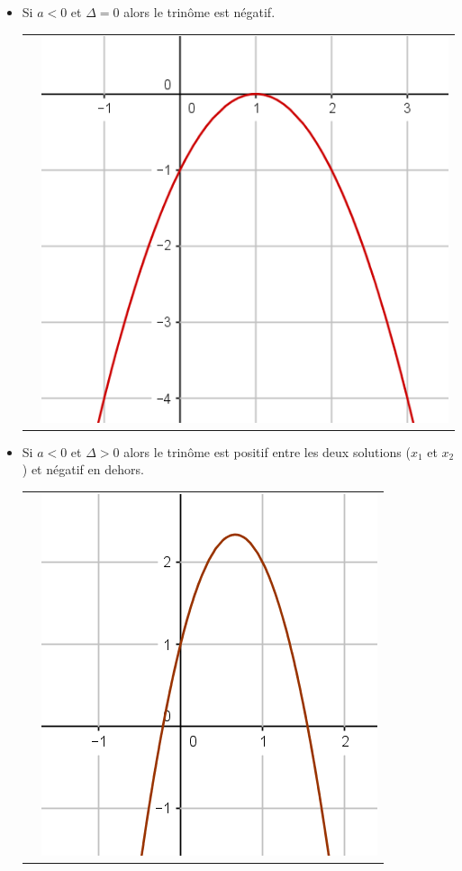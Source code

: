 \documentclass[12pt,a4paper]{article}
\begin{document}
\begin{itemize}
			
				
				\item 
				Si $a < 0$ et $\Delta = 0$ alors le trinôme est négatif.
				
				\begin{tabular}{ll }
					 &
					
					\includegraphics[scale=0.25]{./img/fig_2}\\
				\end{tabular}
				
				\item 
				Si $a < 0$ et $\Delta > 0$ alors le trinôme est positif entre les deux solutions ($x_1$ et $x_2$) et négatif en dehors.
				
				\begin{tabular}{ll }
					 &
					
					\includegraphics[scale=0.25]{./img/fig_4}\\
				\end{tabular}
			
		\end{itemize}
	
\end{document}
